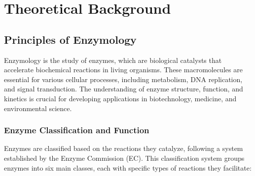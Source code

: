\section{Theoretical Background}

\subsection{Principles of Enzymology}
\label{sec:Principles of Enzymology}

Enzymology is the study of enzymes, which are biological catalysts that accelerate biochemical reactions in living organisms. These macromolecules are essential for various cellular processes, including metabolism, DNA replication, and signal transduction. The understanding of enzyme structure, function, and kinetics is crucial for developing applications in biotechnology, medicine, and environmental science. \autocite{robinsonEnzymesPrinciplesBiotechnological2015}

\subsubsection{Enzyme Classification and Function}
\label{sec:Enzyme Classification and Function}

Enzymes are classified based on the reactions they catalyze, following a system established by the Enzyme Commission (EC). This classification system groups enzymes into six main classes, each with specific types of reactions they facilitate:

